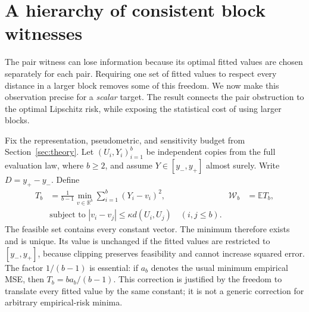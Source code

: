 \section{A hierarchy of consistent block witnesses}
\label{sec:block-witness}

The pair witness can lose information because its optimal fitted values are
chosen separately for each pair. Requiring one set of fitted values to
respect every distance in a larger block removes some of this freedom. We
now make this observation precise for a \emph{scalar} target. The result
connects the pair obstruction to the optimal Lipschitz risk, while exposing
the statistical cost of using larger blocks.

Fix the representation, pseudometric, and sensitivity budget from
Section~\ref{sec:theory}. Let $(U_i,Y_i)_{i=1}^b$ be independent copies
from the full evaluation law, where $b\geq2$, and assume
$Y\in[y_-,y_+]$ almost surely. Write $D=y_+-y_-$. Define
\begin{equation}
 \begin{aligned}
 T_b&=\frac{1}{b-1}\min_{v\in\mathbb R^b}
       \sum_{i=1}^b(Y_i-v_i)^2,
 &\mathcal{W}_b&=\mathbb E T_b,\\
 &\text{subject to }|v_i-v_j|\leq\kappa d(U_i,U_j)
       \quad(i,j\leq b).
 \end{aligned}
 \label{eq:block-witness}
\end{equation}
The feasible set contains every constant vector. The minimum therefore
exists and is unique. Its value is unchanged if the fitted values are
restricted to $[y_-,y_+]$, because clipping preserves feasibility and
cannot increase squared error. The factor $1/(b-1)$ is essential: if
$a_b$ denotes the usual minimum empirical MSE, then
$T_b=b a_b/(b-1)$. This correction is justified by the freedom to translate
every fitted value by the same constant; it is not a generic correction
for arbitrary empirical-risk minima.

